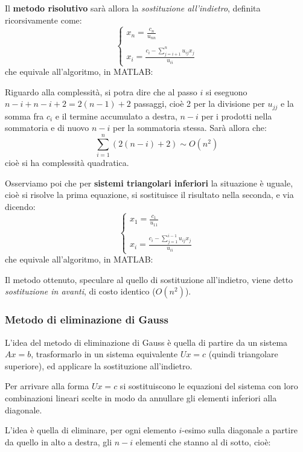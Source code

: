 \documentclass[a4paper,11pt]{article}
\begin{document}
Il \textbf{metodo risolutivo} sarà allora la \textit{sostituzione all'indietro}, definita ricorsivamente come:
\[
	\begin{cases}
		x_n = \frac{c_n}{u_{nn}} \\\\ 
		x_i = \frac{ c_i - \sum_{j = i + 1}^n u_{ij} x_j }{u_{ii}}
	\end{cases}
\]
che equivale all'algoritmo, in MATLAB:


Riguardo alla complessità, si potra dire che al passo $i$ si eseguono $n - i + n - i + 2 = 2(n - 1) + 2$ passaggi, cioè 2 per la divisione per $u_{jj}$ e la somma fra $c_i$ e il termine accumulato a destra, $n - i$ per i prodotti nella sommatoria e di nuovo $n - i$ per la sommatoria stessa.
Sarà allora che:
$$
\sum_{i = 1}^n \left( 2(n - i) + 2 \right) \sim O(n^2)
$$
cioè si ha complessità quadratica.

Osserviamo poi che per \textbf{sistemi triangolari inferiori} la situazione è uguale, cioè si risolve la prima equazione, si sostituisce il risultato nella seconda, e via dicendo:
\[
	\begin{cases}
		x_1 = \frac{c_1}{u_{11}} \\\\ 
		x_i = \frac{ c_i - \sum_{j = 1}^{i - 1} u_{ij} x_j }{u_{ii}}
	\end{cases}
\]
che equivale all'algoritmo, in MATLAB:


Il metodo ottenuto, speculare al quello di sostituzione all'indietro, viene detto \textit{sostituzione in avanti}, di costo identico ($O(n^2)$).

\subsubsection{Metodo di eliminazione di Gauss}
L'idea del metodo di eliminazione di Gauss è quella di partire da un sistema $Ax = b$, trasformarlo in un sistema equivalente $Ux = c$ (quindi triangolare superiore), ed applicare la sostituzione all'indietro.

Per arrivare alla forma $Ux = c$ si sostituiscono le equazioni del sistema con loro combinazioni lineari scelte in modo da annullare gli elementi inferiori alla diagonale.

L'idea è quella di eliminare, per ogni elemento $i$-esimo sulla diagonale a partire da quello in alto a destra, gli $n - i$ elementi che stanno al di sotto, cioè:
\end{document}
